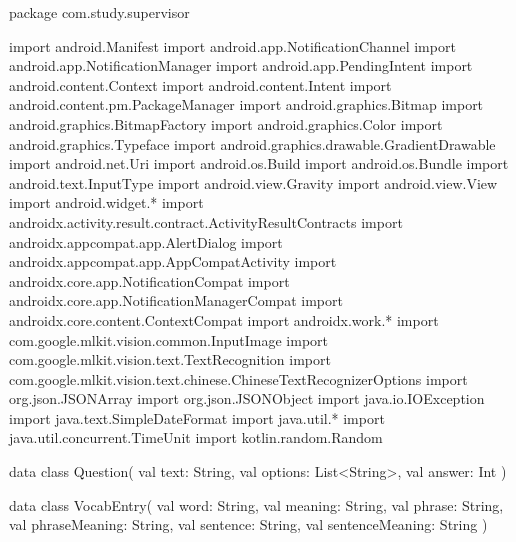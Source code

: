 package com.study.supervisor

import android.Manifest
import android.app.NotificationChannel
import android.app.NotificationManager
import android.app.PendingIntent
import android.content.Context
import android.content.Intent
import android.content.pm.PackageManager
import android.graphics.Bitmap
import android.graphics.BitmapFactory
import android.graphics.Color
import android.graphics.Typeface
import android.graphics.drawable.GradientDrawable
import android.net.Uri
import android.os.Build
import android.os.Bundle
import android.text.InputType
import android.view.Gravity
import android.view.View
import android.widget.*
import androidx.activity.result.contract.ActivityResultContracts
import androidx.appcompat.app.AlertDialog
import androidx.appcompat.app.AppCompatActivity
import androidx.core.app.NotificationCompat
import androidx.core.app.NotificationManagerCompat
import androidx.core.content.ContextCompat
import androidx.work.*
import com.google.mlkit.vision.common.InputImage
import com.google.mlkit.vision.text.TextRecognition
import com.google.mlkit.vision.text.chinese.ChineseTextRecognizerOptions
import org.json.JSONArray
import org.json.JSONObject
import java.io.IOException
import java.text.SimpleDateFormat
import java.util.*
import java.util.concurrent.TimeUnit
import kotlin.random.Random

data class Question(
    val text: String,
    val options: List<String>,
    val answer: Int
)

data class VocabEntry(
    val word: String,
    val meaning: String,
    val phrase: String,
    val phraseMeaning: String,
    val sentence: String,
    val sentenceMeaning: String
)


